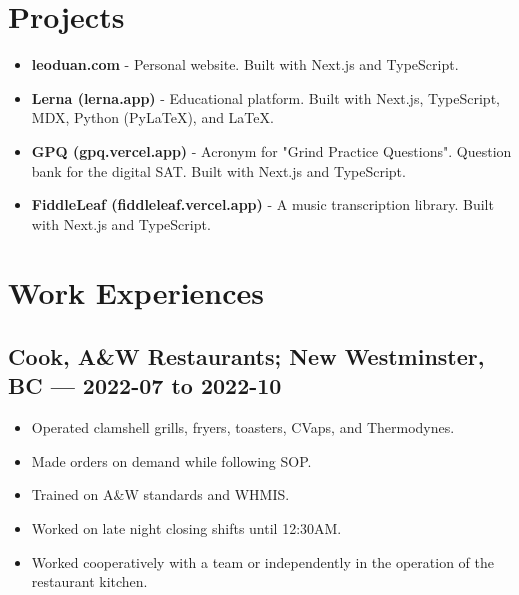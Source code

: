 \documentclass{article}
\begin{document}
\section*{Projects}

\begin{itemize}
    \item \textbf{leoduan.com} - Personal website. Built with Next.js and TypeScript.
    \item \textbf{Lerna (lerna.app)} - Educational platform. Built with Next.js, TypeScript, MDX, Python (PyLaTeX), and LaTeX.
    \item \textbf{GPQ (gpq.vercel.app)} - Acronym for "Grind Practice Questions". Question bank for the digital SAT. Built with Next.js and TypeScript.
    \item \textbf{FiddleLeaf (fiddleleaf.vercel.app)} - A music transcription library. Built with Next.js and TypeScript.
\end{itemize}

\section*{Work Experiences}

\subsection*{Cook, A\&W Restaurants; New Westminster, BC — 2022-07 to 2022-10}

\begin{itemize}
    \item Operated clamshell grills, fryers, toasters, CVaps, and Thermodynes.
    \item Made orders on demand while following SOP.
    \item Trained on A\&W standards and WHMIS.
    \item Worked on late night closing shifts until 12:30AM.
    \item Worked cooperatively with a team or independently in the operation of the restaurant kitchen.
\end{itemize}


\end{document}
